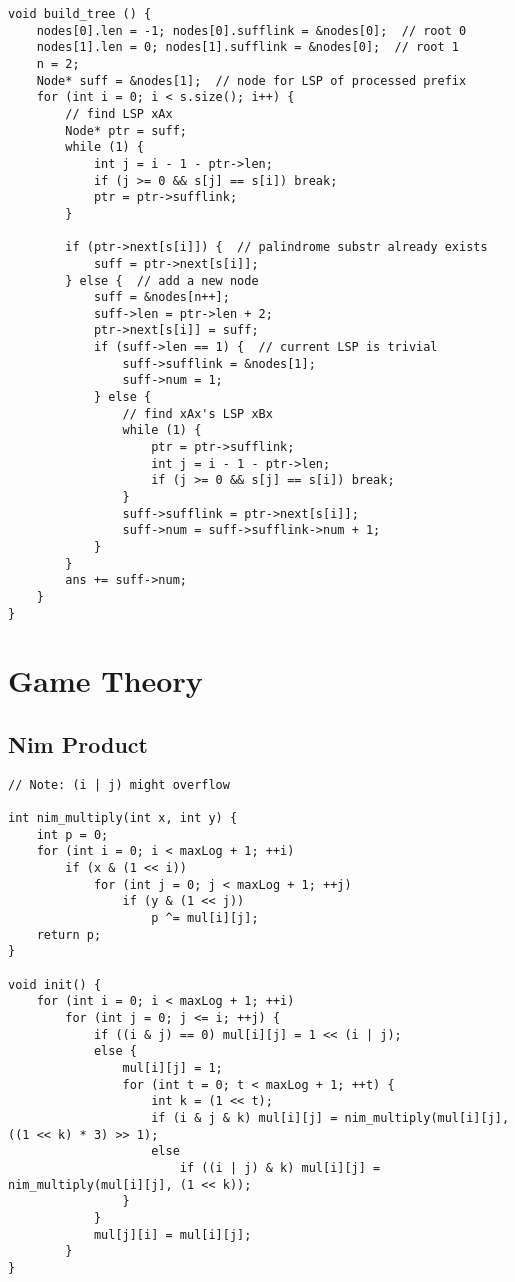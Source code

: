 \documentclass[10pt,landscape]{article}
\begin{document}
\begin{multicols}{2}
\begin{lstlisting}
void build_tree () {
    nodes[0].len = -1; nodes[0].sufflink = &nodes[0];  // root 0
    nodes[1].len = 0; nodes[1].sufflink = &nodes[0];  // root 1
    n = 2;
    Node* suff = &nodes[1];  // node for LSP of processed prefix
    for (int i = 0; i < s.size(); i++) {
        // find LSP xAx
        Node* ptr = suff;
        while (1) {
            int j = i - 1 - ptr->len;
            if (j >= 0 && s[j] == s[i]) break;
            ptr = ptr->sufflink;
        }

        if (ptr->next[s[i]]) {  // palindrome substr already exists
            suff = ptr->next[s[i]];
        } else {  // add a new node
            suff = &nodes[n++];
            suff->len = ptr->len + 2;
            ptr->next[s[i]] = suff;
            if (suff->len == 1) {  // current LSP is trivial
                suff->sufflink = &nodes[1];
                suff->num = 1;
            } else {
                // find xAx's LSP xBx
                while (1) {
                    ptr = ptr->sufflink;
                    int j = i - 1 - ptr->len;
                    if (j >= 0 && s[j] == s[i]) break;
                }
                suff->sufflink = ptr->next[s[i]];
                suff->num = suff->sufflink->num + 1;
            }
        }
        ans += suff->num;
    }
}
\end{lstlisting}
\section{Game Theory}
\subsection{Nim Product}
\begin{lstlisting}
// Note: (i | j) might overflow

int nim_multiply(int x, int y) {
    int p = 0;
    for (int i = 0; i < maxLog + 1; ++i)
        if (x & (1 << i))
            for (int j = 0; j < maxLog + 1; ++j)
                if (y & (1 << j))
                    p ^= mul[i][j];
    return p;
}

void init() {
    for (int i = 0; i < maxLog + 1; ++i)
        for (int j = 0; j <= i; ++j) {
            if ((i & j) == 0) mul[i][j] = 1 << (i | j);
            else {
                mul[i][j] = 1;
                for (int t = 0; t < maxLog + 1; ++t) {
                    int k = (1 << t);
                    if (i & j & k) mul[i][j] = nim_multiply(mul[i][j], ((1 << k) * 3) >> 1);
                    else
                        if ((i | j) & k) mul[i][j] = nim_multiply(mul[i][j], (1 << k));
                }
            }
            mul[j][i] = mul[i][j];
        }
}
\end{lstlisting}

\end{multicols}
\end{document}

